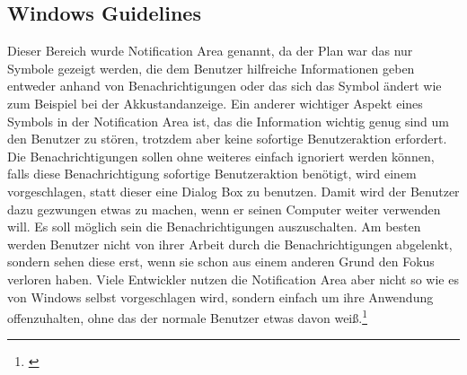 \subsection{Windows Guidelines}
Dieser Bereich wurde Notification Area genannt, da der Plan war das nur Symbole gezeigt werden, die dem Benutzer hilfreiche Informationen geben entweder anhand von Benachrichtigungen oder das sich das Symbol ändert wie zum Beispiel bei der Akkustandanzeige. Ein anderer wichtiger Aspekt eines Symbols in der Notification Area ist, das die Information wichtig genug sind um den Benutzer zu stören, trotzdem aber keine sofortige  Benutzeraktion erfordert. Die Benachrichtigungen sollen ohne weiteres einfach ignoriert werden können, falls diese Benachrichtigung sofortige Benutzeraktion benötigt, wird einem vorgeschlagen, statt dieser eine Dialog Box zu benutzen. Damit wird der Benutzer dazu gezwungen etwas zu machen, wenn er seinen Computer weiter verwenden will. Es soll möglich sein die Benachrichtigungen auszuschalten. Am besten werden Benutzer nicht von ihrer Arbeit durch die Benachrichtigungen abgelenkt, sondern sehen diese erst, wenn sie schon aus einem anderen Grund den Fokus verloren haben. Viele Entwickler nutzen die Notification Area aber nicht so wie es von Windows selbst vorgeschlagen wird, sondern einfach um ihre Anwendung offenzuhalten, ohne das der normale Benutzer etwas davon weiß.\footnote[2]{\cite[Vgl.][]{17}}